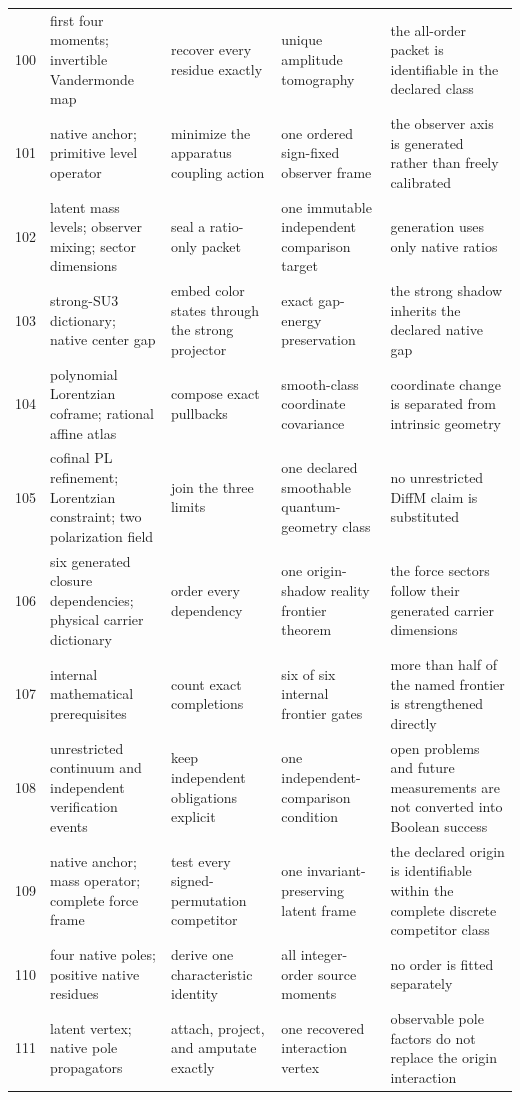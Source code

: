 \documentclass[11pt]{article}
\numberwithin{equation}{section}
\theoremstyle{remark}
\begin{document}
\begin{landscape}
\begin{longtable}{p{0.65cm}p{3.5cm}p{4.0cm}p{4.0cm}p{4.6cm}}
100&first four moments; invertible Vandermonde map&recover every residue exactly&unique amplitude tomography&the all-order packet is identifiable in the declared class\\
101&native anchor; primitive level operator&minimize the apparatus coupling action&one ordered sign-fixed observer frame&the observer axis is generated rather than freely calibrated\\
102&latent mass levels; observer mixing; sector dimensions&seal a ratio-only packet&one immutable independent comparison target&generation uses only native ratios\\
103&strong-SU3 dictionary; native center gap&embed color states through the strong projector&exact gap-energy preservation&the strong shadow inherits the declared native gap\\
104&polynomial Lorentzian coframe; rational affine atlas&compose exact pullbacks&smooth-class coordinate covariance&coordinate change is separated from intrinsic geometry\\
105&cofinal PL refinement; Lorentzian constraint; two polarization field&join the three limits&one declared smoothable quantum-geometry class&no unrestricted DiffM claim is substituted\\
106&six generated closure dependencies; physical carrier dictionary&order every dependency&one origin-shadow reality frontier theorem&the force sectors follow their generated carrier dimensions\\
107&internal mathematical prerequisites&count exact completions&six of six internal frontier gates&more than half of the named frontier is strengthened directly\\
108&unrestricted continuum and independent verification events&keep independent obligations explicit&one independent-comparison condition&open problems and future measurements are not converted into Boolean success\\
109&native anchor; mass operator; complete force frame&test every signed-permutation competitor&one invariant-preserving latent frame&the declared origin is identifiable within the complete discrete competitor class\\
110&four native poles; positive native residues&derive one characteristic identity&all integer-order source moments&no order is fitted separately\\
111&latent vertex; native pole propagators&attach, project, and amputate exactly&one recovered interaction vertex&observable pole factors do not replace the origin interaction\\

\end{longtable}
\end{landscape}
\end{document}
